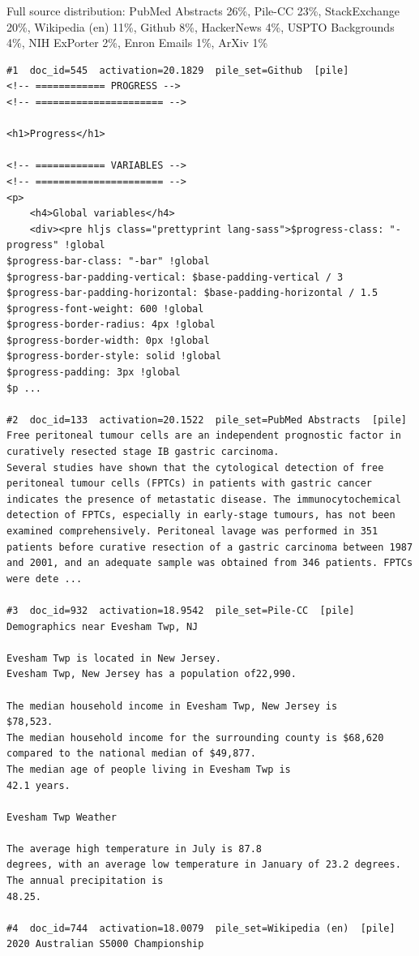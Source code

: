 Full source distribution: PubMed Abstracts 26\%, Pile-CC 23\%, StackExchange 20\%, Wikipedia (en) 11\%, Github 8\%, HackerNews 4\%, USPTO Backgrounds 4\%, NIH ExPorter 2\%, Enron Emails 1\%, ArXiv 1\%

\begin{verbatim}
#1  doc_id=545  activation=20.1829  pile_set=Github  [pile]
<!-- ============ PROGRESS -->
<!-- ====================== -->

<h1>Progress</h1>

<!-- ============ VARIABLES -->
<!-- ====================== -->
<p>
	<h4>Global variables</h4>
	<div><pre hljs class="prettyprint lang-sass">$progress-class: "-progress" !global
$progress-bar-class: "-bar" !global
$progress-bar-padding-vertical: $base-padding-vertical / 3
$progress-bar-padding-horizontal: $base-padding-horizontal / 1.5
$progress-font-weight: 600 !global
$progress-border-radius: 4px !global
$progress-border-width: 0px !global
$progress-border-style: solid !global
$progress-padding: 3px !global
$p ...

#2  doc_id=133  activation=20.1522  pile_set=PubMed Abstracts  [pile]
Free peritoneal tumour cells are an independent prognostic factor in curatively resected stage IB gastric carcinoma.
Several studies have shown that the cytological detection of free peritoneal tumour cells (FPTCs) in patients with gastric cancer indicates the presence of metastatic disease. The immunocytochemical detection of FPTCs, especially in early-stage tumours, has not been examined comprehensively. Peritoneal lavage was performed in 351 patients before curative resection of a gastric carcinoma between 1987 and 2001, and an adequate sample was obtained from 346 patients. FPTCs were dete ...

#3  doc_id=932  activation=18.9542  pile_set=Pile-CC  [pile]
Demographics near Evesham Twp, NJ

Evesham Twp is located in New Jersey.
Evesham Twp, New Jersey has a population of22,990.

The median household income in Evesham Twp, New Jersey is
$78,523.
The median household income for the surrounding county is $68,620
compared to the national median of $49,877.
The median age of people living in Evesham Twp is
42.1 years.

Evesham Twp Weather

The average high temperature in July is 87.8
degrees, with an average low temperature in January of 23.2 degrees.
The annual precipitation is
48.25.

#4  doc_id=744  activation=18.0079  pile_set=Wikipedia (en)  [pile]
2020 Australian S5000 Championship


\end{verbatim}
